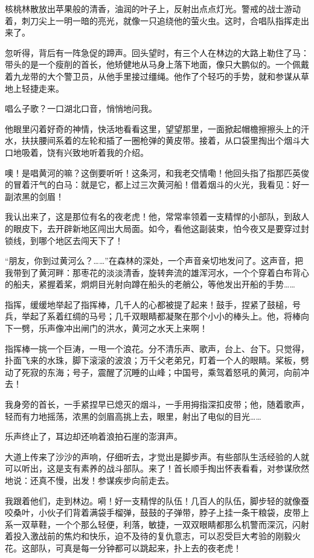 \documentclass[12pt,UTF-8,openany]{ctexbook}
\begin{document}
\begin{normalsize}
    核桃林散放出苹果般的清香，油润的叶子上，反射出点点灯光。警戒的战士游动着，刺刀尖上一明一暗的亮光，就像一只追绕他的萤火虫。这时，合唱队指挥走出来了。
    
    忽听得，背后有一阵急促的蹄声。回头望时，有三个人在林边的大路上勒住了马：带头的是一个瘦削的首长，他矫健地从马身上落下地面，像只大鹏似的。一个佩戴着九龙带的大个警卫员，从他手里接过缰绳。他作了个轻巧的手势，就和参谋从草地上轻捷走来。
    
    唱么子歌？一口湖北口音，悄悄地问我。
    
    他眼里闪着好奇的神情，快活地看看这里，望望那里，一面掀起帽檐擦擦头上的汗水，扶扶腰间系着的左轮和插了一圈枪弹的黄皮带。接着，从口袋里掏出个烟斗大口地吸着，饶有兴致地听着我的介绍。
    
    噢！是唱黄河的嘛？这倒要听听！这条河，和我老交情嘞！他回头指了指那匹英俊的冒着汗气的白马：就是它，都上过三次黄河船！借着烟斗的火光，我看见：好一副浓黑的剑眉！
    
    我认出来了，这是那位有名的夜老虎！他，常常率领着一支精悍的小部队，到敌人的眼皮下，去开辟新地区闯出大局面。如今，看他这副装束，怕今夜又是要穿过封锁线，到哪个地区去闯天下了！
    
    “朋友，你到过黄河么？……”在森林的深处，一个声音亲切地发问了。这声音，把我带到了黄河畔：那枣花的淡淡清香，旋转奔流的雄浑河水，一个个穿着白布背心的船夫，紧握着桨，炯炯目光射向蹲在船头的老艄公，等他发出开船的手势……
    
    指挥，缓缓地举起了指挥棒，几千人的心都被提了起来！鼓手，捏紧了鼓槌，号兵，举起了系着红绸的马号；几千双眼睛都凝聚在那个小小的棒头上。他，将棒向下一劈，乐声像冲出闸门的洪水，黄河之水天上来啊！
    
    指挥棒一挑一个巨涛，一甩一个浪花。分不清乐声、歌声，台上、台下。只觉得，扑面飞来的水珠，脚下滚滚的波浪；万千父老弟兄，盯着一个人的眼睛。桨板，劈动了死寂的东海；号子，震醒了沉睡的山峰；中国号，乘驾着怒吼的黄河，向前冲去！
    
    我身旁的首长，一手紧捏早已熄灭的烟斗，一手用拇指深扣皮带；他，随着歌声，轻而有力地摇荡，浓黑的剑眉高挑上去，眼里，射出了电似的目光……
    
    乐声终止了，耳边却还响着浪拍石崖的澎湃声。
    
    大道上传来了沙沙的声响，仔细听去，才觉出是脚步声。有些部队生活经验的人就可以听出，这是支有素养的战斗部队。来了！首长顺手掏出怀表看看，对参谋欣然地说：还真不慢，出发！参谋疾步向前走去。
    
    我跟着他们，走到林边。嗬！好一支精悍的队伍！几百人的队伍，脚步轻的就像蚕咬桑叶，小伙子们背着满袋手榴弹，鼓鼓的子弹带，脖子上挂一条干粮袋，皮带上系一双草鞋，一个个那么轻便，利落，敏捷，一双双眼睛都那么机警而深沉，闪射着投入激战前的焦灼和快乐，迫不及待的复仇意志，可以忍受巨大考验的刚毅火花。这部队，可真是每一分钟都可以跳起来，扑上去的夜老虎！
    

\end{normalsize}
\end{document}
